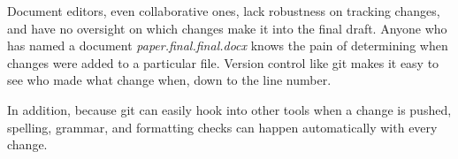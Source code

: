 Document editors, even collaborative ones, lack robustness on tracking changes, and have no oversight on which changes make it into the final draft.
Anyone who has named a document \textit{paper.final.final.docx} knows the pain of determining when changes were added to a particular file.
Version control like git makes it easy to see who made what change when, down to the line number.

In addition, because git can easily hook into other tools when a change is pushed, spelling, grammar, and formatting checks can happen automatically with every change.
